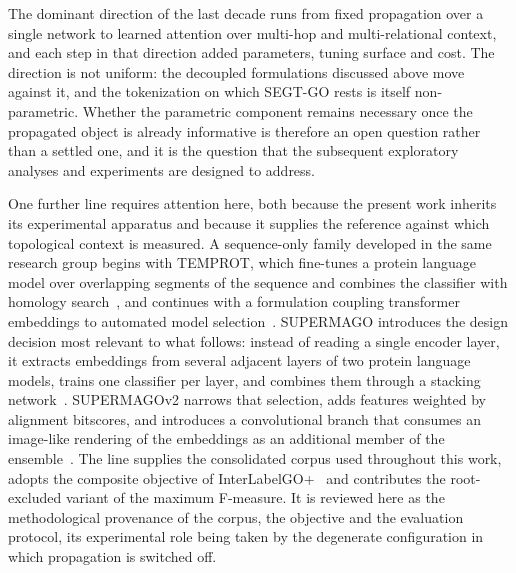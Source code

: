 \documentclass[Ingles]{ic-tese-v3}
\begin{document}
The dominant direction of the last decade runs from fixed propagation over a single network to
learned attention over multi-hop and multi-relational context, and each step in that direction added
parameters, tuning surface and cost. The direction is not uniform: the decoupled formulations
discussed above move against it, and the tokenization on which SEGT-GO rests is itself
non-parametric. Whether the parametric component remains necessary once the propagated object is
already informative is therefore an open question rather than a settled one, and it is the question that the subsequent exploratory analyses and experiments are designed to address.

One further line requires attention here, both because the present work inherits its experimental
apparatus and because it supplies the reference against which topological context is measured. A
sequence-only family developed in the same research group begins with TEMPROT, which fine-tunes a
protein language model over overlapping segments of the sequence and combines the classifier with
homology search~\cite{oliveira2023temprot}, and continues with a formulation coupling transformer
embeddings to automated model selection~\cite{oliveira2024automl}. SUPERMAGO introduces the design
decision most relevant to what follows: instead of reading a single encoder layer, it extracts
embeddings from several adjacent layers of two protein language models, trains one classifier per
layer, and combines them through a stacking network~\cite{oliveira2025supermago}. SUPERMAGOv2 narrows
that selection, adds features weighted by alignment bitscores, and introduces a convolutional branch
that consumes an image-like rendering of the embeddings as an additional member of the
ensemble~\cite{oliveira2025supermagov2}. The line supplies the consolidated corpus used throughout
this work, adopts the composite objective of InterLabelGO+~\cite{liu2024interlabelgo} and contributes
the root-excluded variant of the maximum F-measure. It is reviewed here as the methodological
provenance of the corpus, the objective and the evaluation protocol, its experimental role being
taken by the degenerate configuration in which propagation is switched off.
\end{document}
